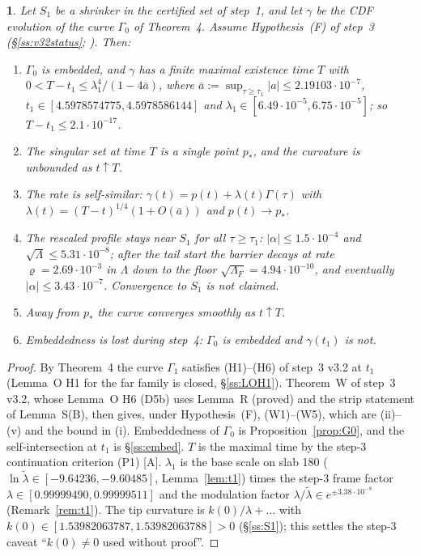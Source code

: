 \documentclass[11pt]{article}
\newtheorem*{namedthm*}{\thisthmname}
\newcommand{\thisthmname}{}
\newenvironment{named}[1]{\renewcommand{\thisthmname}{#1}\begin{namedthm*}}{\end{namedthm*}}
\theoremstyle{definition}
\theoremstyle{remark}
\newcommand{\fn}[1]{\texttt{\detokenize{#1}}}
\newcommand{\tA}{\textnormal{\textsc{[A]}}}
\newcommand{\abs}[1]{\lvert #1\rvert}
\newcommand{\Lam}{\Lambda}
\begin{document}
\begin{named}{Main Theorem of version 2 (v3.2 line; conditional on Hypothesis~(F); history)}
Let $S_1$ be a shrinker in the certified set of step~1, and let $\gamma$ be the CDF evolution of the curve $\Gamma_0$ of Theorem~4. Assume Hypothesis~(F) of step~3 (\S\ref{ss:v32status}; \fn{writeup/main/main.pdf}). Then:
\begin{enumerate}[label=(\roman*)]
\item $\Gamma_0$ is embedded, and $\gamma$ has a finite maximal existence time $T$ with $0<T-t_1\le\lambda_1^4/(1-4\bar a)$, where $\bar a:=\sup_{\tau\ge\tau_1}\abs a\le2.19103\cdot10^{-7}$, $t_1\in[4.5978574775,4.5978586144]$ and $\lambda_1\in[6.49\cdot10^{-5},6.75\cdot10^{-5}]$; so $T-t_1\le2.1\cdot10^{-17}$.
\item The singular set at time $T$ is a single point $p_*$, and the curvature is unbounded as $t\uparrow T$.
\item The rate is self-similar: $\gamma(t)=p(t)+\lambda(t)\Gamma(\tau)$ with $\lambda(t)=(T-t)^{1/4}(1+O(\bar a))$ and $p(t)\to p_*$.
\item The rescaled profile stays near $S_1$ for all $\tau\ge\tau_1$: $\abs\alpha\le1.5\cdot10^{-4}$ and $\sqrt\Lam\le5.31\cdot10^{-8}$; after the tail start the barrier decays at rate $\varrho=2.69\cdot10^{-3}$ in $\Lam$ down to the floor $\sqrt{\Lam_F}=4.94\cdot10^{-10}$, and eventually $\abs\alpha\le3.43\cdot10^{-7}$. Convergence to $S_1$ is not claimed.
\item Away from $p_*$ the curve converges smoothly as $t\uparrow T$.
\item Embeddedness is lost during step~4: $\Gamma_0$ is embedded and $\gamma(t_1)$ is not.
\end{enumerate}
\end{named}
\begin{proof}
By Theorem~4 the curve $\Gamma_1$ satisfies (H1)--(H6) of step~3 v3.2 at $t_1$ (Lemma~O H1 for the far family is closed, \S\ref{ss:LOH1}). Theorem~W of step~3 v3.2, whose Lemma~O H6 (D5b) uses Lemma~R (proved) and the strip statement of Lemma~S(B), then gives, under Hypothesis~(F), (W1)--(W5), which are (ii)--(v) and the bound in (i). Embeddedness of $\Gamma_0$ is Proposition~\ref{prop:G0}, and the self-intersection at $t_1$ is \S\ref{ss:embed}. $T$ is the maximal time by the step-3 continuation criterion (P1) \tA. $\lambda_1$ is the base scale on slab 180 ($\ln\tilde\lambda\in[-9.64236,-9.60485]$, Lemma~\ref{lem:t1}) times the step-3 frame factor $\lambda\in[0.99999490,0.99999511]$ and the modulation factor $\lambda/\tilde\lambda\in e^{\pm3.38\cdot10^{-8}}$ (Remark~\ref{rem:t1}). The tip curvature is $k(0)/\lambda+\dots$ with $k(0)\in[1.53982063787,1.53982063788]>0$ (\S\ref{ss:S1}); this settles the step-3 caveat ``$k(0)\neq0$ used without proof''.
\end{proof}
\end{document}
